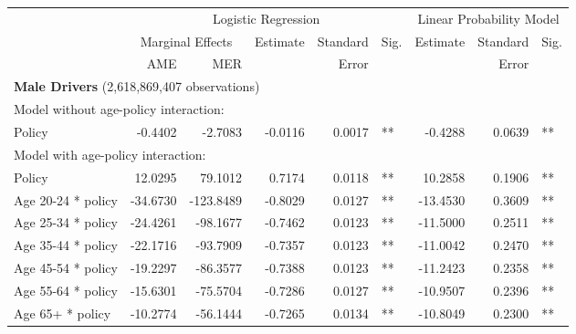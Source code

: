 
\begin{table}%
\centering 
\begin{tabular}{l r r r r l r r l} 

\hline 
 
 & \multicolumn{5}{c}{Logistic Regression}  & \multicolumn{3}{c}{Linear Probability Model} \\ 

 \cmidrule(lr){2-6}\cmidrule(lr){7-9} 
 & \multicolumn{2}{c}{Marginal Effects} & Estimate & Standard & Sig. & Estimate & Standard & Sig. \\ 

 \cmidrule(lr){2-3} 
 &   AME &  MER  &          &  Error   &      &          &  Error   &     \\ 

\hline 
 
\multicolumn{8}{l}{\textbf{Male Drivers} (2,618,869,407 observations)} \\ 

\hline
\multicolumn{8}{l}{Model without age-policy interaction: } \\ 
Policy                   &  -0.4402        &  -2.7083       &  -0.0116        &  0.0017       &   **       &  -0.4288        &  0.0639       &   **       \\ 
\hline
\multicolumn{8}{l}{Model with age-policy interaction: } \\ 
Policy                   &  12.0295        &  79.1012       &  0.7174        &  0.0118       &   **       &  10.2858        &  0.1906       &   **       \\ 
Age 20-24 * policy   &  -34.6730        &  -123.8489       &  -0.8029        &  0.0127       &   **       &  -13.4530        &  0.3609       &   **       \\ 
Age 25-34 * policy   &  -24.4261        &  -98.1677       &  -0.7462        &  0.0123       &   **       &  -11.5000        &  0.2511       &   **       \\ 
Age 35-44 * policy   &  -22.1716        &  -93.7909       &  -0.7357        &  0.0123       &   **       &  -11.0042        &  0.2470       &   **       \\ 
Age 45-54 * policy   &  -19.2297        &  -86.3577       &  -0.7388        &  0.0123       &   **       &  -11.2423        &  0.2358       &   **       \\ 
Age 55-64 * policy   &  -15.6301        &  -75.5704       &  -0.7286        &  0.0127       &   **       &  -10.9507        &  0.2396       &   **       \\ 
Age 65+ * policy   &  -10.2774        &  -56.1444       &  -0.7265        &  0.0134       &   **       &  -10.8049        &  0.2300       &   **       \\ 


\end{tabular}
\end{table}

